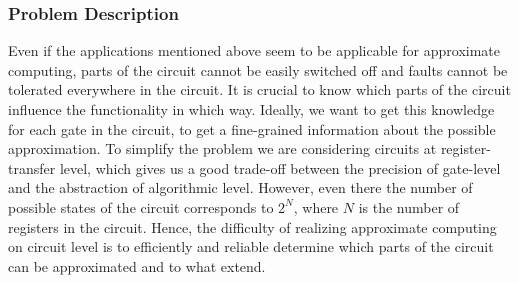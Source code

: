\documentclass[conference]{IEEEtran}
\begin{document}
\subsubsection*{Problem Description}
Even if the applications mentioned above seem to be applicable for approximate computing, parts of the circuit cannot be easily switched off and faults cannot be tolerated everywhere in the circuit. It is crucial to know which parts of the circuit influence the functionality in which way. Ideally, we want to get this knowledge for each gate in the circuit, to get a fine-grained information about the possible approximation. To simplify the problem we are considering circuits at register-transfer level, which gives us a good trade-off between the precision of gate-level and the abstraction of algorithmic level. However, even there the number of possible states of the circuit corresponds to $2^N$, where $N$ is the number of registers in the circuit. Hence, the difficulty of realizing approximate computing on circuit level is to efficiently and reliable determine which parts of the circuit can be approximated and to what extend.
\end{document}
